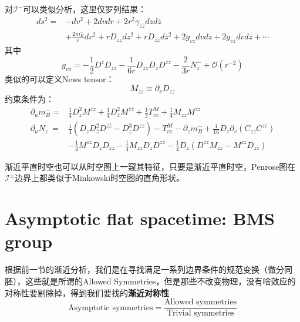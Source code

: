 对$\mathcal{I}^{-}$可以类似分析，这里仅罗列结果：
\begin{equation}
	\begin{aligned}
		ds^2=&-dv^2+2dvdr+2r^2\gamma_{z\bar z}dzd{\bar z}\\
		&+\frac{2m^-_B}{r}dv^2+rD_{zz}dz^2+rD_{\bar z\bar z}d{\bar z}^2+2g_{vz}dvdz+2g_{v\bar z}dvd\bar z+\cdots
	\end{aligned}
\end{equation}
其中
\begin{equation}
	g_{vz}=-\frac{1}{2}D^zD_{zz}-\frac{1}{6r}D_{zz}D_zD^{zz}-\frac{2}{3r}N^-_z+\mathcal{O}(r^{-2})
\end{equation}
类似的可以定义News tensor：
\begin{equation}
	M_{zz}\equiv \partial_v D_{zz}
\end{equation}
约束条件为：
\begin{equation}
	\begin{aligned}
		\partial_u m^-_B=&\frac{1}{4}D_z^2M^{zz}+\frac{1}{4}D_{\bar z}^2M^{\bar z\bar z}+\frac{1}{2}T^M_{vv}+\frac{1}{4}M_{zz}M^{zz}\\
		\partial_u N^-_z=&\frac{1}{4}\left(D_zD_{\bar z}^2D^{\bar z\bar z}-D^3_zD^{zz}\right)-T^{M}_{vz}-\partial_z m^-_B+\frac{1}{16}D_z\partial_v(C_{zz}C^{zz})\\
		&-\frac{1}{4}M^{zz}D_zD_{zz}-\frac{1}{4}M_{zz}D_zD^{zz}-\frac{1}{4}D_z\left(D^{zz}M_{zz}-M^{zz}D_{zz}\right)
	\end{aligned}
\end{equation}

渐近平直时空也可以从时空图上一窥其特征\cite{zhaoliu}，只要是渐近平直时空，Penrose图在$\mathcal{I}^\pm$边界上都类似于Minkowski时空图的直角形状。

\section{Asymptotic flat spacetime: BMS group}
根据前一节的渐近分析，我们是在寻找满足一系列边界条件的规范变换（微分同胚），这些就是所谓的Allowed Symmetries，但是那些不改变物理，没有啥效应的对称性要剔除掉，得到我们要找的\textbf{渐近对称性}
\begin{equation}
	\text{Asymptotic symmetries}=\frac{\text{Allowed symmetries}}{\text{Trivial symmetries}}
\end{equation}

